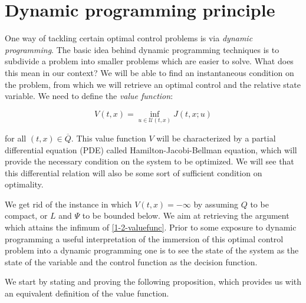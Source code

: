 \section{Dynamic programming principle}

One way of tackling certain optimal control problems is via \textit{dynamic programming}. The basic idea behind dynamic programming techniques is to subdivide a problem into smaller problems which are easier to solve. What does this mean in our context?
We will be able to find an instantaneous condition on the problem, from which we will retrieve an optimal control and the relative state variable. We need to define the \textit{value function}:

\begin{equation}\label{1-2-valuefunc}
    V(t,x)=\inf_{u\in \mathcal{U}(t,x)}J(t,x;u)
\end{equation}

for all $(t,x)\in\overline{Q}$. This value function $V$ will be characterized by a partial differential equation (PDE) called Hamilton-Jacobi-Bellman equation, which will provide the necessary condition on the system to be optimized. We will see that this differential relation will also be some sort of sufficient condition on optimality.

We get rid of the instance in which $V(t,x)=-\infty$ by assuming $Q$ to be compact, or $L$ and $\Psi$ to be bounded below.
We aim at retrieving the argument which attains the infimum of \eqref{1-2-valuefunc}. Prior to some exposure to dynamic programming a useful interpretation of the immersion of this optimal control problem into 
a dynamic programming one is to see the state of the system as the state of the variable and the control function as the decision function. 

We start by stating and proving the following proposition, which provides us with an equivalent definition of the value function.

